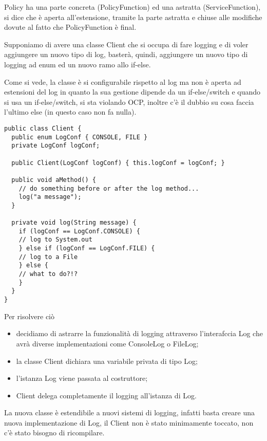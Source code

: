 Policy ha una parte concreta (PolicyFunction) ed una astratta (ServiceFunction), si dice che è aperta all'estensione, tramite la parte astratta e chiuse alle modifiche 
dovute al fatto che PolicyFunction è final.
\smallskip

Supponiamo di avere una classe Client che si occupa di fare logging e di voler aggiungere un nuovo tipo di log, basterà, quindi, aggiungere un nuovo tipo di logging ad 
enum ed un nuovo ramo allo if-else.

Come si vede, la classe è si configurabile rispetto al log ma non è aperta ad estensioni del log in quanto la sua gestione dipende da un if-else/switch e quando si usa 
un if-else/switch, si sta violando OCP, inoltre c'è il dubbio su cosa faccia l'ultimo else (in questo caso non fa nulla).

\begin{lstlisting}[linewidth=10cm]
public class Client {
  public enum LogConf { CONSOLE, FILE }
  private LogConf logConf;
  
  public Client(LogConf logConf) { this.logConf = logConf; }
  
  public void aMethod() {
    // do something before or after the log method...
    log("a message");
  }

  private void log(String message) {
    if (logConf == LogConf.CONSOLE) {
    // log to System.out
    } else if (logConf == LogConf.FILE) {
    // log to a File
    } else {
    // what to do?!?
    }
  }
}
\end{lstlisting}

\newpage
Per risolvere ciò
\begin{itemize}
  \item decidiamo di astrarre la funzionalità di logging attraverso l'interafccia Log che avrà diverse implementazioni come ConsoleLog o FileLog;
  \item la classe Client dichiara una variabile privata di tipo Log;
  \item l’istanza Log viene passata al costruttore;
  \item Client delega completamente il logging all’istanza di Log.
\end{itemize}

La nuova classe è estendibile a nuovi sistemi di logging, infatti basta creare una nuova implementazione di Log, il Client non è stato minimamente toccato, non c'è 
stato bisogno di ricompilare.

